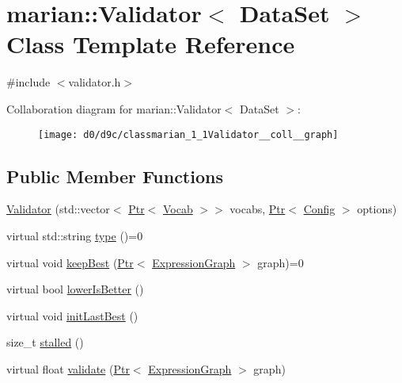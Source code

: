 \hypertarget{classmarian_1_1Validator}{}\section{marian\+:\+:Validator$<$ Data\+Set $>$ Class Template Reference}
\label{classmarian_1_1Validator}


{\ttfamily \#include $<$validator.\+h$>$}



Collaboration diagram for marian\+:\+:Validator$<$ Data\+Set $>$\+:
\nopagebreak
\begin{figure}[H]
\begin{center}
\leavevmode
\texttt{[image: d0/d9c/classmarian\_1\_1Validator\_\_coll\_\_graph]}
\end{center}
\end{figure}
\subsection*{Public Member Functions}
\begin{DoxyCompactItemize}
\item 
\hyperlink{classmarian_1_1Validator_a438455be8ec5c8e0158ad4d8586b6d51}{Validator} (std\+::vector$<$ \hyperlink{namespacemarian_ad1a373be43a00ef9ce35666145137b08}{Ptr}$<$ \hyperlink{classmarian_1_1Vocab}{Vocab} $>$$>$ vocabs, \hyperlink{namespacemarian_ad1a373be43a00ef9ce35666145137b08}{Ptr}$<$ \hyperlink{classmarian_1_1Config}{Config} $>$ options)
\item 
virtual std\+::string \hyperlink{classmarian_1_1Validator_a46fae77a7ebd17d3727beb0858f025f0}{type} ()=0
\item 
virtual void \hyperlink{classmarian_1_1Validator_ab70989b9c6aef7dc0d0655fd066e7fa9}{keep\+Best} (\hyperlink{namespacemarian_ad1a373be43a00ef9ce35666145137b08}{Ptr}$<$ \hyperlink{classmarian_1_1ExpressionGraph}{Expression\+Graph} $>$ graph)=0
\item 
virtual bool \hyperlink{classmarian_1_1Validator_a48b6583b7452642638e3fe463b27c9bb}{lower\+Is\+Better} ()
\item 
virtual void \hyperlink{classmarian_1_1Validator_a6f65080ef5845f74757a5deafc5a397f}{init\+Last\+Best} ()
\item 
size\+\_\+t \hyperlink{classmarian_1_1Validator_aa72a8e064f655802123c7c18e6bc229e}{stalled} ()
\item 
virtual float \hyperlink{classmarian_1_1Validator_a30afe5c990329fdb37133cad5e323c31}{validate} (\hyperlink{namespacemarian_ad1a373be43a00ef9ce35666145137b08}{Ptr}$<$ \hyperlink{classmarian_1_1ExpressionGraph}{Expression\+Graph} $>$ graph)
\end{DoxyCompactItemize}
